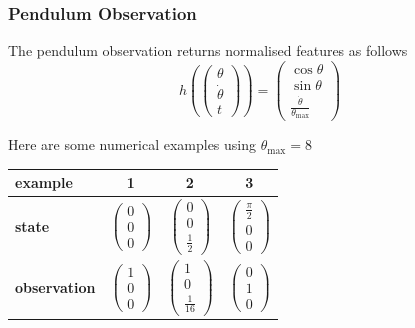 \documentclass[aspectratio=169,11pt,xcolor=dvipsnames]{beamer}
\begin{document}
\begin{frame}
  \frametitle{Pendulum Observation}
  \begin{center}
    \begin{minipage}{.8\textwidth}
      The pendulum observation returns normalised features as follows
      \begin{equation*}
        h(
        \begin{pmatrix}
          \theta \\
          \dot{\theta} \\
          t
        \end{pmatrix}
        )
        =
        \begin{pmatrix}
          \cos\theta \\
          \sin\theta \\
          \frac{\dot{\theta}}{\theta_{\max}}
        \end{pmatrix}
      \end{equation*}

      Here are some numerical examples using $\theta_{\max} = 8$
      \begin{center}
        \begin{tabular}{lccc}\toprule
          \textbf{example} &
          1 &
          2 &
          3 \\\midrule
          \textbf{state} &
          $\begin{pmatrix} 0 \\ 0 \\ 0\end{pmatrix}$ &
          $\begin{pmatrix} 0 \\ 0 \\ \frac{1}{2}\end{pmatrix}$ &
          $\begin{pmatrix} \frac{\pi}{2} \\ 0 \\ 0\end{pmatrix}$ \\
          \textbf{observation} &
          $\begin{pmatrix} 1 \\ 0 \\ 0\end{pmatrix}$ &
          $\begin{pmatrix} 1 \\ 0 \\ \frac{1}{16}\end{pmatrix}$ &
          $\begin{pmatrix} 0 \\ 1 \\ 0\end{pmatrix}$ \\\bottomrule
        \end{tabular}
      \end{center}
    \end{minipage}
  \end{center}
\end{frame}
\end{document}
